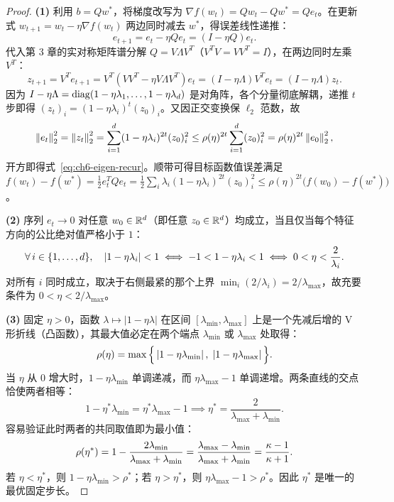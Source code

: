 \begin{proof}
\textbf{(1)} 利用 $b = Q w^*$，将梯度改写为 $\nabla f(w_t) = Qw_t - Qw^* = Q e_t$。在更新式 $w_{t+1} = w_t - \eta \nabla f(w_t)$ 两边同时减去 $w^*$，得误差线性递推：
\[
  e_{t+1} = e_t - \eta Q e_t = (I - \eta Q) e_t.
\]
代入第 3 章的实对称矩阵谱分解 $Q = V\Lambda V^T$（$V^T V = V V^T = I$），在两边同时左乘 $V^T$：
\[
  z_{t+1} = V^T e_{t+1} = V^T (V V^T - \eta V\Lambda V^T) e_t = (I - \eta \Lambda) V^T e_t = (I - \eta \Lambda) z_t.
\]
因为 $I - \eta\Lambda = \operatorname{diag}(1-\eta\lambda_1, \dots, 1-\eta\lambda_d)$ 是对角阵，各个分量彻底解耦，递推 $t$ 步即得 $(z_t)_i = (1-\eta\lambda_i)^t (z_0)_i$。又因正交变换保 $\ell_2$ 范数，故
\[
  \left\|e_t\right\|_2^2 = \left\|z_t\right\|_2^2 = \sum_{i=1}^d (1-\eta\lambda_i)^{2t} (z_0)_i^2
  \le \rho(\eta)^{2t} \sum_{i=1}^d (z_0)_i^2 = \rho(\eta)^{2t} \left\|e_0\right\|_2^2,
\]
开方即得式~\eqref{eq:ch6-eigen-recur}。顺带可得目标函数值误差满足 $f(w_t) - f(w^*) = \frac{1}{2}e_t^T Q e_t = \frac{1}{2}\sum_i \lambda_i (1-\eta\lambda_i)^{2t}(z_0)_i^2 \le \rho(\eta)^{2t}\big(f(w_0)-f(w^*)\big)$。

\textbf{(2)} 序列 $e_t \to 0$ 对任意 $w_0\in\mathbb{R}^d$（即任意 $z_0\in\mathbb{R}^d$）均成立，当且仅当每个特征方向的公比绝对值严格小于 $1$：
\[
  \forall\, i\in\{1,\dots,d\},\quad \left|1 - \eta\lambda_i\right| < 1
  \iff -1 < 1 - \eta\lambda_i < 1
  \iff 0 < \eta < \frac{2}{\lambda_i}.
\]
对所有 $i$ 同时成立，取决于右侧最紧的那个上界 $\min_i (2/\lambda_i) = 2/\lambda_{\max}$，故充要条件为 $0 < \eta < 2/\lambda_{\max}$。

\textbf{(3)} 固定 $\eta > 0$，函数 $\lambda \mapsto |1 - \eta\lambda|$ 在区间 $[\lambda_{\min}, \lambda_{\max}]$ 上是一个先减后增的 V 形折线（凸函数），其最大值必定在两个端点 $\lambda_{\min}$ 或 $\lambda_{\max}$ 处取得：
\[
  \rho(\eta) = \max\Big\{\left|1 - \eta\lambda_{\min}\right|,\; \left|1 - \eta\lambda_{\max}\right|\Big\}.
\]
当 $\eta$ 从 $0$ 增大时，$1 - \eta\lambda_{\min}$ 单调递减，而 $\eta\lambda_{\max} - 1$ 单调递增。两条直线的交点恰使两者相等：
\[
  1 - \eta^*\lambda_{\min} = \eta^*\lambda_{\max} - 1
  \implies \eta^* = \frac{2}{\lambda_{\max} + \lambda_{\min}}.
\]
容易验证此时两者的共同取值即为最小值：
\[
  \rho(\eta^*) = 1 - \frac{2\lambda_{\min}}{\lambda_{\max} + \lambda_{\min}}
               = \frac{\lambda_{\max} - \lambda_{\min}}{\lambda_{\max} + \lambda_{\min}}
               = \frac{\kappa - 1}{\kappa + 1}.
\]
若 $\eta < \eta^*$，则 $1 - \eta\lambda_{\min} > \rho^*$；若 $\eta > \eta^*$，则 $\eta\lambda_{\max} - 1 > \rho^*$。因此 $\eta^*$ 是唯一的最优固定步长。
\end{proof}

